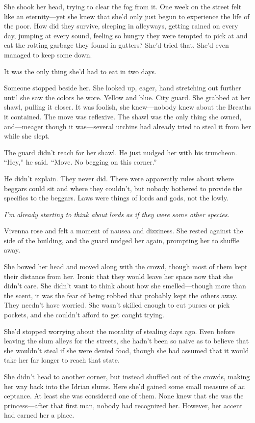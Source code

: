 She shook her head, trying to clear the fog from it. One week on the street felt like an eternity—yet she knew that she’d only just begun to experience the life of the poor. How did they survive, sleeping in alleyways, getting rained on every day, jumping at every sound, feeling so hungry they were tempted to pick at and eat the rotting garbage they found in gutters? She’d tried that. She’d even managed to keep some down.

It was the only thing she’d had to eat in two days.

Someone stopped beside her. She looked up, eager, hand stretching out further until she saw the colors he wore. Yellow and blue. City guard. She grabbed at her shawl, pulling it closer. It was foolish, she knew—nobody knew about the Breaths it contained. The move was reflexive. The shawl was the only thing she owned, and—meager though it was—several urchins had already tried to steal it from her while she slept.

The guard didn’t reach for her shawl. He just nudged her with his truncheon. “Hey,” he said. “Move. No begging on this corner.”

He didn’t explain. They never did. There were apparently rules about where beggars could sit and where they couldn’t, but nobody bothered to provide the specifics to the beggars. Laws were things of lords and gods, not the lowly.

\textit{I’m already starting to think about lords as if they were some other species.}

Vivenna rose and felt a moment of nausea and dizziness. She rested against the side of the building, and the guard nudged her again, prompting her to shuffle away.

She bowed her head and moved along with the crowd, though most of them kept their distance from her. Ironic that they would leave her space now that she didn’t care. She didn’t want to think about how she smelled—though more than the scent, it was the fear of being robbed that probably kept the others away. They needn’t have worried. She wasn’t skilled enough to cut purses or pick pockets, and she couldn’t afford to get caught trying.

She’d stopped worrying about the morality of stealing days ago. Even before leaving the slum alleys for the streets, she hadn’t been so naive as to believe that she wouldn’t steal if she were denied food, though she had assumed that it would take her far longer to reach that state.

She didn’t head to another corner, but instead shuffled out of the crowds, making her way back into the Idrian slums. Here she’d gained some small measure of ac ceptance. At least she was considered one of them. None knew that she was the princess—after that first man, nobody had recognized her. However, her accent had earned her a place.

